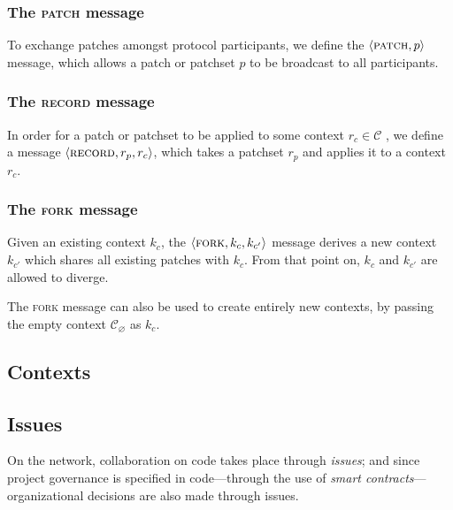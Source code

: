 \subsubsection{The \textsc{patch} message}
\label{patch-op}

To exchange patches amongst protocol participants, we define the
$\langle \text{\normalfont\scshape patch}, p \rangle$ message, which allows a patch or patchset $p$ to be broadcast
to all participants.

\subsubsection{The \textsc{record} message}
\label{record-op}

In order for a patch or patchset to be applied to some context $r_c \in
\mathcal{C}$ , we define a message $\langle \text{\normalfont\scshape record}, r_p, r_c \rangle$, which takes a
patchset $r_p$ and applies it to a context $r_c$.

\subsubsection{The \textsc{fork} message}
\label{fork-op}

Given an existing context $k_c$, the $\langle \text{\normalfont\scshape fork}, k_c, k_{c'} \rangle$ message derives
a new context $k_{c'}$ which shares all existing patches with $k_c$. From that
point on, $k_c$ and $k_{c'}$ are allowed to diverge.

The \textsc{fork} message can also be used to create entirely new contexts, by
passing the empty context $\mathcal{C}_\varnothing$ as $k_c$.

\subsection{Contexts}
\todo{}





\subsection{Issues}
\label{issues}

On the \oscoin{} network, collaboration on code takes place through \emph{issues};
and since project governance is specified in code---through the use of
\emph{smart contracts}---organizational decisions are also made through issues.

